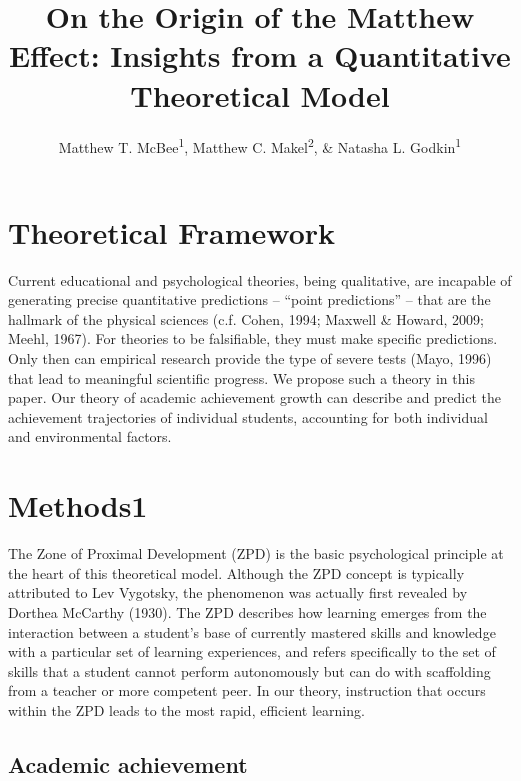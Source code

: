 \documentclass[english,floatsintext,man]{apa6}
\title{On the Origin of the Matthew Effect: Insights from a Quantitative
Theoretical Model}
\author{Matthew T. McBee\textsuperscript{1}, Matthew C. Makel\textsuperscript{2}, \& Natasha L. Godkin\textsuperscript{1}}
\affiliation{
    \vspace{0.5cm}
          \textsuperscript{1} East Tennessee State University\\
          \textsuperscript{2} Duke University Talent Identification Program  }
\theoremstyle{definition}
\theoremstyle{definition}
\theoremstyle{definition}
\theoremstyle{remark}
\begin{document}
\maketitle

\setcounter{secnumdepth}{0}



\section{Theoretical Framework}\label{theoretical-framework}

Current educational and psychological theories, being qualitative, are
incapable of generating precise quantitative predictions --
\enquote{point predictions} -- that are the hallmark of the physical
sciences (c.f. Cohen, 1994; Maxwell \& Howard, 2009; Meehl, 1967). For
theories to be falsifiable, they must make specific predictions. Only
then can empirical research provide the type of severe tests (Mayo,
1996) that lead to meaningful scientific progress. We propose such a
theory in this paper. Our theory of academic achievement growth can
describe and predict the achievement trajectories of individual
students, accounting for both individual and environmental factors.

\section{Methods1}\label{methods1}

The Zone of Proximal Development (ZPD) is the basic psychological
principle at the heart of this theoretical model. Although the ZPD
concept is typically attributed to Lev Vygotsky, the phenomenon was
actually first revealed by Dorthea McCarthy (1930). The ZPD describes
how learning emerges from the interaction between a student's base of
currently mastered skills and knowledge with a particular set of
learning experiences, and refers specifically to the set of skills that
a student cannot perform autonomously but can do with scaffolding from a
teacher or more competent peer. In our theory, instruction that occurs
within the ZPD leads to the most rapid, efficient learning.

\subsection{Academic achievement}\label{academic-achievement}
\end{document}
